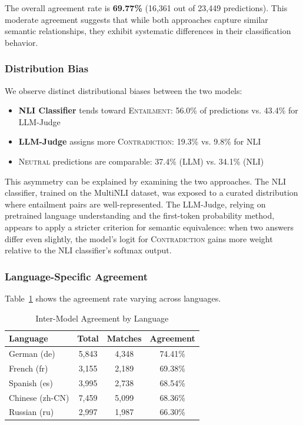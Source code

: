     The overall agreement rate is \textbf{69.77\%} (16,361 out of 23,449 predictions). This moderate agreement suggests that while both approaches capture similar semantic relationships, they exhibit systematic differences in their classification behavior.

    \subsubsection{Distribution Bias}

    We observe distinct distributional biases between the two models:

    \begin{itemize}
        \item \textbf{NLI Classifier} tends toward \textsc{Entailment}: 56.0\% of predictions vs. 43.4\% for LLM-Judge
        \item \textbf{LLM-Judge} assigns more \textsc{Contradiction}: 19.3\% vs. 9.8\% for NLI
        \item \textsc{Neutral} predictions are comparable: 37.4\% (LLM) vs. 34.1\% (NLI)
    \end{itemize}

    This asymmetry can be explained by examining the two approaches. The NLI classifier, trained on the MultiNLI dataset, was exposed to a curated distribution where entailment pairs are well-represented. The LLM-Judge, relying on pretrained language understanding and the first-token probability method, appears to apply a stricter criterion for semantic equivalence: when two answers differ even slightly, the model's logit for \textsc{Contradiction} gains more weight relative to the NLI classifier's softmax output.

    \subsubsection{Language-Specific Agreement}

    Table~\ref{tab:language_agreement} shows the agreement rate varying across languages.

    \begin{table}[htbp]
    \centering
    \caption{Inter-Model Agreement by Language}
    \label{tab:language_agreement}
    \begin{tabular}{lccc}
    \hline
    \textbf{Language} & \textbf{Total} & \textbf{Matches} & \textbf{Agreement} \\
    \hline
    German (de) & 5,843 & 4,348 & 74.41\% \\
    French (fr) & 3,155 & 2,189 & 69.38\% \\
    Spanish (es) & 3,995 & 2,738 & 68.54\% \\
    Chinese (zh-CN) & 7,459 & 5,099 & 68.36\% \\
    Russian (ru) & 2,997 & 1,987 & 66.30\% \\
    \hline
    \end{tabular}
    \end{table}

